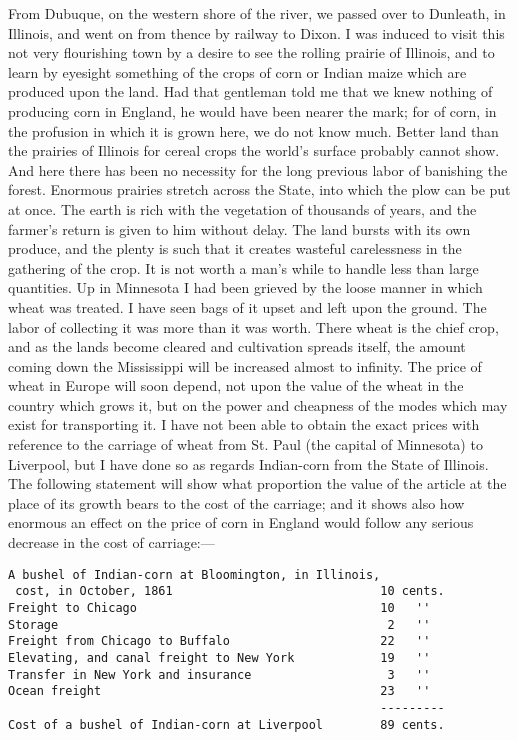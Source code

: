 From Dubuque, on the western shore of the river, we passed over to
Dunleath, in Illinois, and went on from thence by railway to Dixon.
I was induced to visit this not very flourishing town by a desire
to see the rolling prairie of Illinois, and to learn by eyesight
something of the crops of corn or Indian maize which are produced
upon the land.  Had that gentleman told me that we knew nothing of
producing corn in England, he would have been nearer the mark; for
of corn, in the profusion in which it is grown here, we do not know
much.  Better land than the prairies of Illinois for cereal crops
the world's surface probably cannot show.  And here there has been
no necessity for the long previous labor of banishing the forest.
Enormous prairies stretch across the State, into which the plow can
be put at once.  The earth is rich with the vegetation of thousands
of years, and the farmer's return is given to him without delay.
The land bursts with its own produce, and the plenty is such that
it creates wasteful carelessness in the gathering of the crop.  It
is not worth a man's while to handle less than large quantities.
Up in Minnesota I had been grieved by the loose manner in which
wheat was treated.  I have seen bags of it upset and left upon the
ground.  The labor of collecting it was more than it was worth.
There wheat is the chief crop, and as the lands become cleared and
cultivation spreads itself, the amount coming down the Mississippi
will be increased almost to infinity.  The price of wheat in Europe
will soon depend, not upon the value of the wheat in the country
which grows it, but on the power and cheapness of the modes which
may exist for transporting it.  I have not been able to obtain the
exact prices with reference to the carriage of wheat from St. Paul
(the capital of Minnesota) to Liverpool, but I have done so as
regards Indian-corn from the State of Illinois.  The following
statement will show what proportion the value of the article at the
place of its growth bears to the cost of the carriage; and it shows
also how enormous an effect on the price of corn in England would
follow any serious decrease in the cost of carriage:---%

{\small
\begin{verbatim}
A bushel of Indian-corn at Bloomington, in Illinois,
 cost, in October, 1861                             10 cents.
Freight to Chicago                                  10   ''
Storage                                              2   ''
Freight from Chicago to Buffalo                     22   ''
Elevating, and canal freight to New York            19   ''
Transfer in New York and insurance                   3   ''
Ocean freight                                       23   ''
                                                    ---------
Cost of a bushel of Indian-corn at Liverpool        89 cents.
\end{verbatim}}


